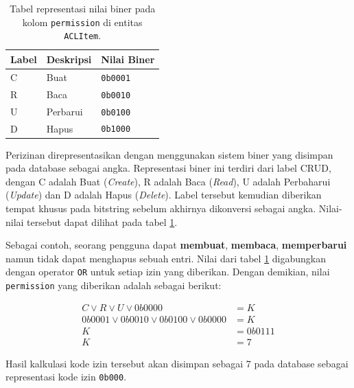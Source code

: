     \begin{table}[H]
        \centering
        \caption{Tabel representasi nilai biner pada kolom \texttt{permission}
        di entitas \texttt{ACLItem}.}
        \label{tab:aclitem_level}
        \begin{tabular}{|l|l|l|}
        \hline
        Label & Deskripsi & Nilai Biner \\ \hline
        C     & Buat      & \texttt{0b0001}        \\ \hline
        R     & Baca      & \texttt{0b0010}        \\ \hline
        U     & Perbarui  & \texttt{0b0100}        \\ \hline
        D     & Hapus     & \texttt{0b1000}        \\ \hline
        \end{tabular}
    \end{table}
        
    
    Perizinan direpresentasikan dengan menggunakan sistem biner yang disimpan
    pada database sebagai angka. Representasi biner ini terdiri dari label CRUD,
    dengan C adalah Buat (\textit{Create}), R adalah Baca (\textit{Read}), U
    adalah Perbaharui (\textit{Update}) dan D adalah Hapus (\textit{Delete}).
    Label tersebut kemudian diberikan tempat khusus pada bitstring sebelum
    akhirnya dikonversi sebagai angka. Nilai-nilai tersebut dapat dilihat pada
    tabel \ref{tab:aclitem_level}.
    
    
    Sebagai contoh, seorang pengguna dapat \textbf{membuat}, \textbf{membaca},
    \textbf{memperbarui} namun tidak dapat menghapus sebuah entri. Nilai dari
    tabel \ref{tab:aclitem_level} digabungkan dengan operator \texttt{OR} untuk
    setiap izin yang diberikan. Dengan demikian, nilai \texttt{permission} yang
    diberikan adalah sebagai berikut:
    
    \begin{subequations}
        \begin{align}
            C \vee R \vee U \vee 0b0000 &= K\\
            0b0001 \vee 0b0010 \vee 0b0100 \vee 0b0000 &= K \\
            K &= 0b0111 \\
            K &= 7
        \end{align}
    \end{subequations}
    
    Hasil kalkulasi kode izin tersebut akan disimpan sebagai 7 pada database
    sebagai representasi kode izin \texttt{0b000}. 
    
